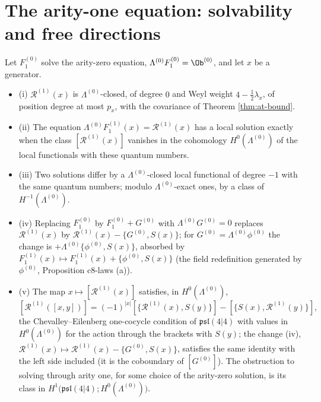 
\section{The arity-one equation: solvability and free directions}
\label{sec:at-eq1}

\begin{theorem}
\label{thm:at-eq1}
Let $F_1^{(0)}$ solve the arity-zero equation, $\Lambda^{(0)}F_1^{(0)}=\Ob^{(0)}$, and let $x$ be a generator.
\begin{itemize}
\item (i) $\mathcal R^{(1)}(x)$ is $\Lambda^{(0)}$-closed, of degree $0$ and Weyl weight $4-\tfrac12\lambda_x$, of position degree at most $p_x$, with the covariance of Theorem \ref{thm:at-bound}.
\item (ii) The equation $\Lambda^{(0)}F_1^{(1)}(x)=\mathcal R^{(1)}(x)$ has a local solution exactly when the class $[\mathcal R^{(1)}(x)]$ vanishes in the cohomology $H^0(\Lambda^{(0)})$ of the local functionals with these quantum numbers.
\item (iii) Two solutions differ by a $\Lambda^{(0)}$-closed local functional of degree $-1$ with the same quantum numbers; modulo $\Lambda^{(0)}$-exact ones, by a class of $H^{-1}(\Lambda^{(0)})$.
\item (iv) Replacing $F_1^{(0)}$ by $F_1^{(0)}+G^{(0)}$ with $\Lambda^{(0)}G^{(0)}=0$ replaces $\mathcal R^{(1)}(x)$ by $\mathcal R^{(1)}(x)-\{G^{(0)},S(x)\}$; for $G^{(0)}=\Lambda^{(0)}\phi^{(0)}$ the change is $+\Lambda^{(0)}\{\phi^{(0)},S(x)\}$, absorbed by $F_1^{(1)}(x)\mapsto F_1^{(1)}(x)+\{\phi^{(0)},S(x)\}$ (the field redefinition generated by $\phi^{(0)}$, Proposition c8-laws (a)).
\item (v) The map $x\mapsto[\mathcal R^{(1)}(x)]$ satisfies, in $H^0(\Lambda^{(0)})$,
\[
[\mathcal R^{(1)}([x,y])]=(-1)^{|x|}[\{\mathcal R^{(1)}(x),S(y)\}]-[\{S(x),\mathcal R^{(1)}(y)\}],
\]
the Chevalley--Eilenberg one-cocycle condition of $\mathfrak{psl}(4|4)$ with values in $H^0(\Lambda^{(0)})$ for the action through the brackets with $S(y)$; the change (iv), $\mathcal R^{(1)}(x)\mapsto\mathcal R^{(1)}(x)-\{G^{(0)},S(x)\}$, satisfies the same identity with the left side included (it is the coboundary of $[G^{(0)}]$). The obstruction to solving through arity one, for some choice of the arity-zero solution, is its class in $H^1\big(\mathfrak{psl}(4|4);H^0(\Lambda^{(0)})\big)$.
\end{itemize}
\end{theorem}

